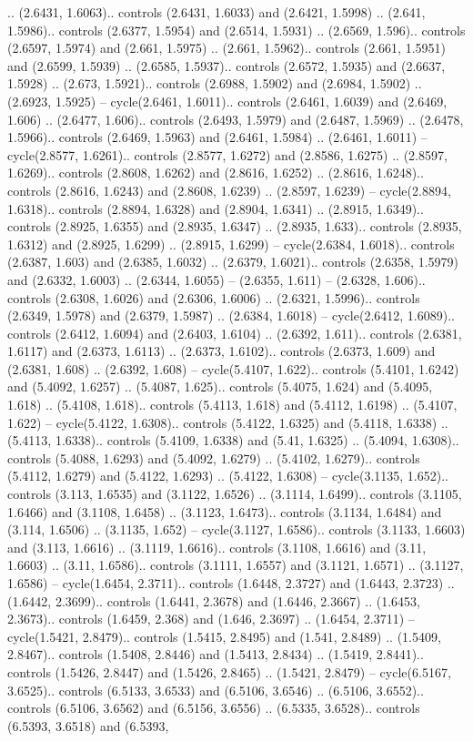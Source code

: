 .. (2.6431, 1.6063).. controls (2.6431, 1.6033) and (2.6421, 1.5998) .. (2.641, 1.5986).. controls (2.6377, 1.5954) and (2.6514, 1.5931) .. (2.6569, 1.596).. controls (2.6597, 1.5974) and (2.661, 1.5975) .. (2.661, 1.5962).. controls (2.661, 1.5951) and (2.6599, 1.5939) .. (2.6585, 1.5937).. controls (2.6572, 1.5935) and (2.6637, 1.5928) .. (2.673, 1.5921).. controls (2.6988, 1.5902) and (2.6984, 1.5902) .. (2.6923, 1.5925) -- cycle(2.6461, 1.6011).. controls (2.6461, 1.6039) and (2.6469, 1.606) .. (2.6477, 1.606).. controls (2.6493, 1.5979) and (2.6487, 1.5969) .. (2.6478, 1.5966).. controls (2.6469, 1.5963) and (2.6461, 1.5984) .. (2.6461, 1.6011) -- cycle(2.8577, 1.6261).. controls (2.8577, 1.6272) and (2.8586, 1.6275) .. (2.8597, 1.6269).. controls (2.8608, 1.6262) and (2.8616, 1.6252) .. (2.8616, 1.6248).. controls (2.8616, 1.6243) and (2.8608, 1.6239) .. (2.8597, 1.6239) -- cycle(2.8894, 1.6318).. controls (2.8894, 1.6328) and (2.8904, 1.6341) .. (2.8915, 1.6349).. controls (2.8925, 1.6355) and (2.8935, 1.6347) .. (2.8935, 1.633).. controls (2.8935, 1.6312) and (2.8925, 1.6299) .. (2.8915, 1.6299) -- cycle(2.6384, 1.6018).. controls (2.6387, 1.603) and (2.6385, 1.6032) .. (2.6379, 1.6021).. controls (2.6358, 1.5979) and (2.6332, 1.6003) .. (2.6344, 1.6055) -- (2.6355, 1.611) -- (2.6328, 1.606).. controls (2.6308, 1.6026) and (2.6306, 1.6006) .. (2.6321, 1.5996).. controls (2.6349, 1.5978) and (2.6379, 1.5987) .. (2.6384, 1.6018) -- cycle(2.6412, 1.6089).. controls (2.6412, 1.6094) and (2.6403, 1.6104) .. (2.6392, 1.611).. controls (2.6381, 1.6117) and (2.6373, 1.6113) .. (2.6373, 1.6102).. controls (2.6373, 1.609) and (2.6381, 1.608) .. (2.6392, 1.608) -- cycle(5.4107, 1.622).. controls (5.4101, 1.6242) and (5.4092, 1.6257) .. (5.4087, 1.625).. controls (5.4075, 1.624) and (5.4095, 1.618) .. (5.4108, 1.618).. controls (5.4113, 1.618) and (5.4112, 1.6198) .. (5.4107, 1.622) -- cycle(5.4122, 1.6308).. controls (5.4122, 1.6325) and (5.4118, 1.6338) .. (5.4113, 1.6338).. controls (5.4109, 1.6338) and (5.41, 1.6325) .. (5.4094, 1.6308).. controls (5.4088, 1.6293) and (5.4092, 1.6279) .. (5.4102, 1.6279).. controls (5.4112, 1.6279) and (5.4122, 1.6293) .. (5.4122, 1.6308) -- cycle(3.1135, 1.652).. controls (3.113, 1.6535) and (3.1122, 1.6526) .. (3.1114, 1.6499).. controls (3.1105, 1.6466) and (3.1108, 1.6458) .. (3.1123, 1.6473).. controls (3.1134, 1.6484) and (3.114, 1.6506) .. (3.1135, 1.652) -- cycle(3.1127, 1.6586).. controls (3.1133, 1.6603) and (3.113, 1.6616) .. (3.1119, 1.6616).. controls (3.1108, 1.6616) and (3.11, 1.6603) .. (3.11, 1.6586).. controls (3.1111, 1.6557) and (3.1121, 1.6571) .. (3.1127, 1.6586) -- cycle(1.6454, 2.3711).. controls (1.6448, 2.3727) and (1.6443, 2.3723) .. (1.6442, 2.3699).. controls (1.6441, 2.3678) and (1.6446, 2.3667) .. (1.6453, 2.3673).. controls (1.6459, 2.368) and (1.646, 2.3697) .. (1.6454, 2.3711) -- cycle(1.5421, 2.8479).. controls (1.5415, 2.8495) and (1.541, 2.8489) .. (1.5409, 2.8467).. controls (1.5408, 2.8446) and (1.5413, 2.8434) .. (1.5419, 2.8441).. controls (1.5426, 2.8447) and (1.5426, 2.8465) .. (1.5421, 2.8479) -- cycle(6.5167, 3.6525).. controls (6.5133, 3.6533) and (6.5106, 3.6546) .. (6.5106, 3.6552).. controls (6.5106, 3.6562) and (6.5156, 3.6556) .. (6.5335, 3.6528).. controls (6.5393, 3.6518) and (6.5393, 